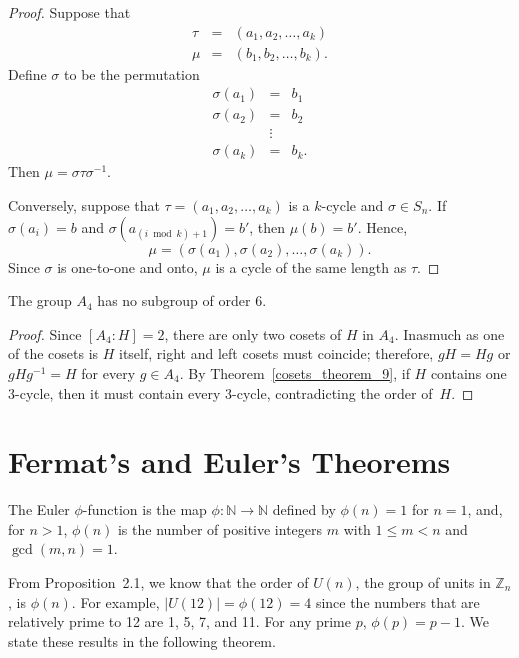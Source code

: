 \begin{proof}
Suppose that
\begin{eqnarray*}
\tau & = & (a_1, a_2, \ldots, a_k ) \\
\mu  & = & (b_1, b_2, \ldots, b_k ).
\end{eqnarray*}
Define $\sigma$ to be the permutation
\begin{eqnarray*}
\sigma( a_1 ) & = & b_1 \\
\sigma( a_2 ) & = & b_2 \\
& \vdots &  \\
\sigma( a_k ) & = & b_k.
\end{eqnarray*}
Then $\mu = \sigma \tau \sigma^{-1}$.

Conversely, suppose that $\tau = (a_1, a_2, \ldots, a_k )$ is a $k$-cycle and $\sigma \in S_n$. If $\sigma( a_i ) = b$ and $\sigma( a_{(i \bmod k) + 1} ) = b'$, then $\mu( b) = b'$.  Hence, 
$$
\mu = ( \sigma(a_1), \sigma(a_2), \ldots, \sigma(a_k) ).
$$
Since $\sigma$ is one-to-one and onto, $\mu$ is a cycle of the same length as $\tau$. 
\end{proof}

\begin{corollary}\label{cosets_theorem_10}
The group $A_4$ has no subgroup of order 6.
\end{corollary}

\begin{proof}
Since $[A_4 : H] = 2$, there are only two cosets of $H$ in $A_4$.  Inasmuch as one of the cosets is $H$ itself, right and left cosets must coincide; therefore, $gH = Hg$ or $g H g^{-1} = H$ for every $g \in A_4$.  By Theorem~\ref{cosets_theorem_9}, if $H$ contains one 3-cycle, then it must contain every 3-cycle, contradicting the order of~$H$. \hspace*{1in}
\end{proof}
 

\section{Fermat's and Euler's Theorems}

The {\bfi Euler} $\phi$-{\bfi function\/} is the map $\phi : {\mathbb N } \rightarrow {\mathbb N}$ defined by $\phi(n) = 1$ for $n=1$, and, for $n > 1$,  $\phi(n)$ is the number of positive integers $m$ with $1 \leq m < n$ and $\gcd(m,n) = 1$. 

From Proposition~2.1, we know that the order of $U(n)$, the group of units in ${\mathbb Z}_n$, is $\phi(n)$. For example, $|U(12)| = \phi(12)  = 4$ since the numbers that are relatively prime to 12 are 1, 5, 7, and 11. For any prime $p$, $\phi(p) = p-1$.  We state these results in the following theorem.

